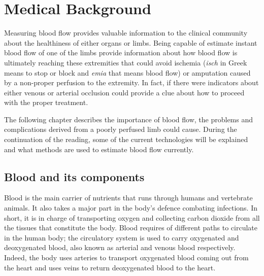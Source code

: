 
\chapter{Medical Background}
\label{chapter1}

\ifpdf
    \graphicspath{{Chapter2/Figs/Raster/}{Chapter2/Figs/PDF/}{Chapter2/Figs/}}
\else
    \graphicspath{{Chapter2/Figs/Vector/}{Chapter2/Figs/}}
\fi

Measuring blood flow provides valuable information to the clinical community about the healthiness of either organs or limbs. Being capable of estimate instant blood flow of one of the limbs provide information about how blood flow is ultimately reaching these extremities that could avoid ischemia (\textit{isch} in Greek means to stop or block and \textit{emia} that means blood flow) or amputation caused by a non-proper perfusion to the extremity. In fact, if there were indicators about either venous or arterial occlusion could provide a clue about how to proceed with the proper treatment.


The following chapter describes the importance of blood flow, the problems and complications derived from a poorly perfused limb could cause. During the continuation of the reading, some of the current technologies will be explained and what methods are used to estimate blood flow currently.  

\section{Blood and its components} %
\label{section literature 1}
Blood is the main carrier of nutrients that runs through humans and vertebrate animals. It also takes a major part in the body's defence combating infections. In short, it is in charge of transporting oxygen and collecting carbon dioxide from all the tissues that constitute the body.  Blood requires of different paths to circulate in the human body; the circulatory system is used to carry oxygenated and deoxygenated blood, also known as arterial and venous blood respectively. Indeed, the body uses arteries to transport oxygenated blood coming out from the heart and uses veins to return deoxygenated blood to the heart.

